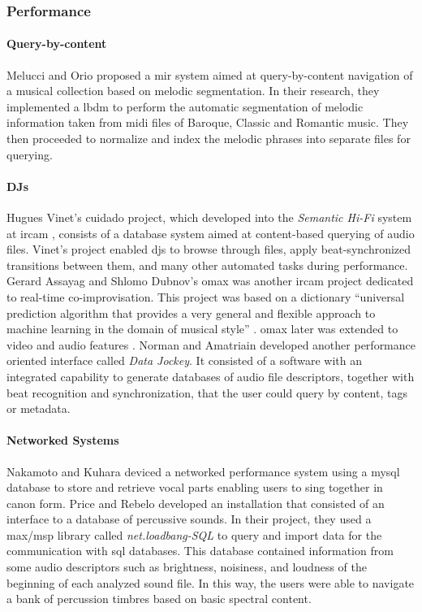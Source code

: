 \subsubsection{Performance}
\label{application:performance}

\paragraph{Query-by-content}
Melucci and Orio \parencite{icmc/bbp2372.1999.355} proposed a \gls{mir} system aimed at query-by-content navigation of a musical collection based on melodic segmentation. In their research, they implemented a \gls{lbdm} to perform the automatic segmentation of melodic information taken from \gls{midi} files of Baroque, Classic and Romantic music. They then proceeded to normalize and index the melodic phrases into separate files for querying.

\paragraph{DJs}
Hugues Vinet's \gls{cuidado} project, which developed into the \textit{Semantic Hi-Fi} system at \gls{ircam} \parencite{DBLP:conf/ismir/VinetHP02, DBLP:conf/icmc/VinetHP02, DBLP:conf/icmc/Vinet05}, consists of a database system aimed at content-based querying of audio files. Vinet's project enabled \glspl{dj} to browse through files, apply beat-synchronized transitions between them, and many other automated tasks during performance. Gerard Assayag and Shlomo Dubnov's \gls{omax} was another \gls{ircam} project dedicated to real-time co-improvisation. This project was based on a dictionary ``universal prediction algorithm that provides a very general and flexible approach to machine learning in the domain of musical style'' \parencite{DBLP:conf/icmc/AssayagDD99}. \gls{omax} later was extended to video and audio features \parencite{DBLP:conf/icmc/BlochD08}. Norman and Amatriain \parencite{icmc/bbp2372.2007.117} developed another performance oriented interface called \textit{Data Jockey}. It consisted of a software with an integrated capability to generate databases of audio file descriptors, together with beat recognition and synchronization, that the user could query by content, tags or metadata.

\paragraph{Networked Systems}
Nakamoto and Kuhara \parencite{Nakamoto2007} deviced a networked performance system using a \gls{mysql} database to store and retrieve vocal parts enabling users to sing together in canon form. Price and Rebelo \parencite{Price2008} developed an installation that consisted of an interface to a database of percussive sounds. In their project, they used a \gls{max/msp} library called \textit{net.loadbang-SQL} to query and import data for the communication with \gls{sql} databases. This database contained information from some audio descriptors such as brightness, noisiness, and loudness of the beginning of each analyzed sound file. In this way, the users were able to navigate a bank of percussion timbres based on basic spectral content. 

